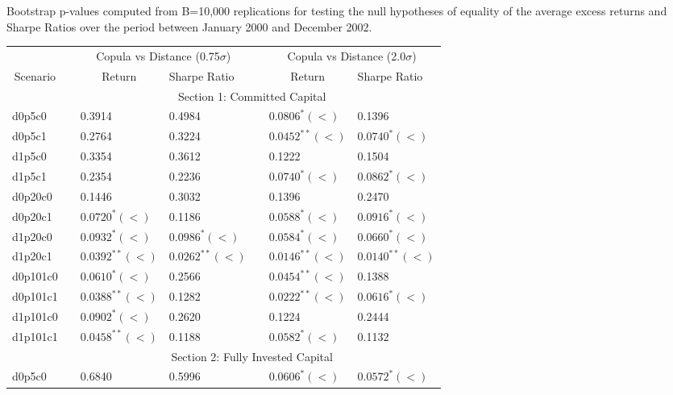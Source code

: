 \documentclass[a4paper]{article}
\begin{document}
	\medskip
	
	\begin{threeparttable}[H]
		\centering \scriptsize
		\caption{Bootstrap p-values computed from B=10,000 replications for testing the null hypotheses of equality of the average excess returns and Sharpe Ratios over the period between January 2000 and December 2002.}
		\begin{tabularx}{\textwidth}{@{\extracolsep{\fill}}lllllll@{}}
			\toprule
			& & \multicolumn{2}{c}{Copula vs Distance (0.75$\sigma$)} & \multicolumn{1}{c}{} & \multicolumn{2}{c}{Copula vs Distance (2.0$\sigma$)} \\
			\cmidrule{3-4}  \cmidrule{6-7}
			\multicolumn{1}{c}{Scenario} & & \multicolumn{1}{c}{Return} & Sharpe Ratio &       & \multicolumn{1}{c}{Return}& Sharpe Ratio \\
			\midrule
			& \multicolumn{6}{c}{Section 1: Committed Capital} \\
			\midrule
			d0p5c0 & & 0.3914 & 0.4984 &       & $0.0806^{*}(<)$ & 0.1396 \\
			d0p5c1 & & 0.2764 & 0.3224 &       & $0.0452^{**}(<)$ & $0.0740^{*}(<)$ \\
			d1p5c0 & & 0.3354 & 0.3612 &       & 0.1222 & 0.1504 \\
			d1p5c1 & & 0.2354 & 0.2236 &       & $0.0740^{*}(<)$ & $0.0862^{*}(<)$ \\
			d0p20c0 & & 0.1446 & 0.3032 &       & 0.1396 & 0.2470 \\
			d0p20c1 & & $0.0720^{*}(<)$ & 0.1186 &       & $0.0588^{*}(<)$ & $0.0916^{*}(<)$ \\
			d1p20c0 & & $0.0932^{*}(<)$ & $0.0986^{*}(<)$ &       & $0.0584^{*}(<)$ & $0.0660^{*}(<)$ \\
			d1p20c1 & & $0.0392^{**}(<)$ & $0.0262^{**}(<)$ &       & $0.0146^{**}(<)$ & $0.0140^{**}(<)$ \\
			d0p101c0 & & $0.0610^{*}(<)$ & 0.2566 &       & $0.0454^{**}(<)$ & 0.1388 \\
			d0p101c1 & & $0.0388^{**}(<)$ & 0.1282 &       & $0.0222^{**}(<)$ & $0.0616^{*}(<)$ \\
			d1p101c0 & & $0.0902^{*}(<)$ & 0.2620 &       & 0.1224 & 0.2444 \\
			d1p101c1 & & $0.0458^{**}(<)$ & 0.1188 &       & $0.0582^{*}(<)$ & 0.1132 \\
			\midrule
			& \multicolumn{6}{c}{Section 2:  Fully Invested Capital } \\
			\midrule
			d0p5c0 & & 0.6840 & 0.5996 &       & $0.0606^{*}(<)$ & $0.0572^{*}(<)$ \\

\end{tabularx}
\end{threeparttable}
\end{document}
